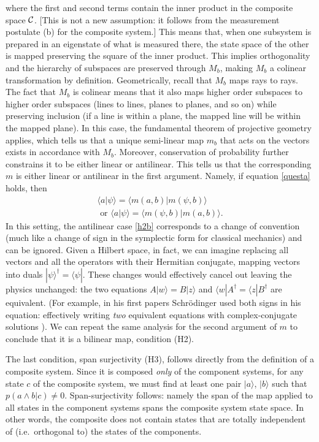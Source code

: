 \documentclass[aps,prl,amsmath,amssymb,twocolumn]{revtex4}
\theoremstyle{plain}
\theoremstyle{definition}
\theoremstyle{remark}
\def\>{\rangle}
\def\<{\langle}
\def\labell#1{\label{#1}}
\begin{document}
where the first and second terms contain the inner product in the
composite space $\cal C$. [This is not a new assumption: it follows
from the measurement postulate (b) for the composite system.] This
means that, when one subsystem is prepared in an eigenstate of what is
measured there, the state space of the other is mapped preserving the
square of the inner product.  This implies orthogonality and the
hierarchy of subspaces are preserved through $M_b$, making $M_b$ a
colinear transformation by definition. Geometrically, recall that
$M_b$ maps rays to rays. The fact that $M_b$ is colinear means that it
also maps higher order subspaces to higher order subspaces (lines to
lines, planes to planes, and so on) while preserving inclusion (if a
line is within a plane, the mapped line will be within the mapped
plane). In this case, the fundamental theorem of projective geometry
\cite{fun} applies, which tells us that a unique semi-linear map $m_b$
that acts on the vectors exists in accordance with $M_b$.  Moreover,
conservation of probability further constrains it to be either linear
or antilinear. This tells us that the corresponding $m$ is either
linear or antilinear in the first argument. Namely, if equation
\eqref{questa} holds, then
	\begin{align}
	\<a|\psi\>=\<m(a,b)|m(\psi,b)\>\labell{h2}\;
	\\\mbox{ or }
	\<a|\psi\>=\<m(\psi,b)|m(a,b)\> \labell{h2b}.
\end{align}
In this setting, the antilinear case \eqref{h2b} corresponds to a
change of convention (much like a change of sign in the symplectic
form for classical mechanics) and can be ignored.  Given a Hilbert
space, in fact, we can imagine replacing all vectors and all the
operators with their Hermitian conjugate, mapping vectors into duals
$|\psi\>^\dag=\<\psi|$. These changes would effectively cancel out
leaving the physics unchanged: the two equations $A|w\>=B|z\>$ and
$\<w|A^\dag=\<z|B^\dag$ are equivalent.  (For example, in his first
papers Schr\"odinger used both signs in his equation: effectively
writing {\em two} equivalent equations with complex-conjugate
solutions \cite{sch}). We can repeat the same analysis for the second
argument of $m$ to conclude that it is a bilinear map, condition (H2).
	
The last condition, span surjectivity (H3), follows directly from the
definition of a composite system. Since it is composed {\em only} of
the component systems, for any state $c$ of the composite system, we
must find at least one pair $|a\>$, $|b\>$ such that
$p(a\wedge b | c)\neq 0$.  Span-surjectivity follows: namely the span
of the map applied to all states in the component systems spans the
composite system state space. In other words, the composite does not
contain states that are totally independent of (i.e.~orthogonal to)
the states of the components.
	
\end{document}
